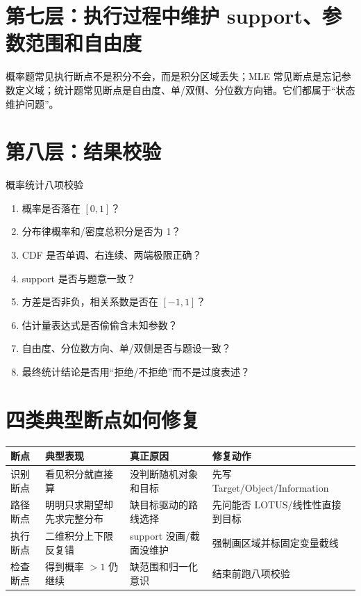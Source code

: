 \documentclass[11pt,a4paper,openany]{ctexbook}
\begin{document}
\section{第七层：执行过程中维护 support、参数范围和自由度}
概率题常见执行断点不是积分不会，而是积分区域丢失；MLE 常见断点是忘记参数定义域；统计题常见断点是自由度、单/双侧、分位数方向错。它们都属于“状态维护问题”。

\section{第八层：结果校验}
\begin{corebox}{概率统计八项校验}
\begin{enumerate}
  \item 概率是否落在 $[0,1]$？
  \item 分布律概率和/密度总积分是否为 1？
  \item CDF 是否单调、右连续、两端极限正确？
  \item support 是否与题意一致？
  \item 方差是否非负，相关系数是否在 $[-1,1]$？
  \item 估计量表达式是否偷偷含未知参数？
  \item 自由度、分位数方向、单/双侧是否与题设一致？
  \item 最终统计结论是否用“拒绝/不拒绝”而不是过度表述？
\end{enumerate}
\end{corebox}

\section{四类典型断点如何修复}
\begin{longtable}{L{2.4cm}L{3.8cm}L{3.8cm}L{\dimexpr\linewidth-10.52cm\relax}}
\toprule
\textbf{断点} & \textbf{典型表现} & \textbf{真正原因} & \textbf{修复动作}\\
\midrule
识别断点 & 看见积分就直接算 & 没判断随机对象和目标 & 先写 Target/Object/Information\\
路径断点 & 明明只求期望却先求完整分布 & 缺目标驱动的路线选择 & 先问能否 LOTUS/线性性直接到目标\\
执行断点 & 二维积分上下限反复错 & support 没画/截面没维护 & 强制画区域并标固定变量截线\\
检查断点 & 得到概率 $>1$ 仍继续 & 缺范围和归一化意识 & 结束前跑八项校验\\
\bottomrule
\end{longtable}
\end{document}
